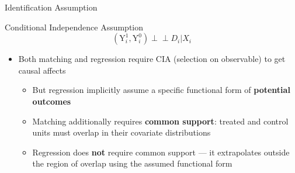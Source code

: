 \documentclass[dvipsnames,hyperref={pdfpagelabels=false}]{beamer}
\newcommand{\indep}{\perp\!\!\!\perp}
\begin{document}
\begin{frame}{Identification Assumption}
	
	\begin{block}{Conditional Independence Assumption}
		\begin{equation*}
		(\mathrm{Y}^{1}_{i},\mathrm{Y}^{0}_{i})\indep D_{i}|X_{i}
		\end{equation*}
	\end{block}
	\begin{itemize}
		
		\vspace{0.3cm}
		\item Both matching and regression require CIA (selection on observable) to get causal affects
		\vspace{0.3cm}
		\begin{itemize}
			\item But regression implicitly assume a specific functional form of \textbf{potential outcomes}
			\vspace{0.2cm}
			\item Matching additionally requires \textbf{common support}: treated and control units must overlap in their covariate distributions
			\vspace{0.2cm}
			\item Regression does \textbf{not} require common support --- it extrapolates outside the region of overlap using the assumed functional form
		\end{itemize}
	\end{itemize}
\end{frame}
\end{document}
